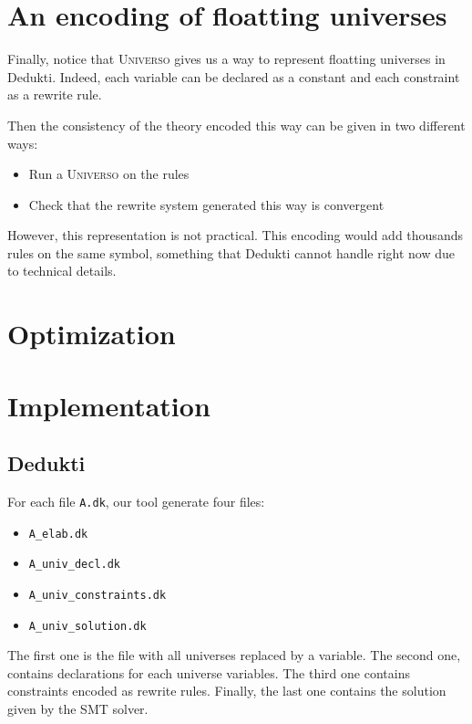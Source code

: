 \documentclass[conference]{IEEEtran}
\newcommand{\universo}{\textsc{Universo}}
\begin{document}
\section{An encoding of floatting universes}

Finally, notice that \universo{} gives us a way to represent floatting universes in Dedukti. Indeed, each variable can be declared as a constant and each constraint as a rewrite rule.

Then the consistency of the theory encoded this way can be given in two different ways:

\begin{itemize}
\item Run a \universo{} on the rules
\item Check that the rewrite system generated this way is convergent
\end{itemize}

However, this representation is not practical. This encoding would add thousands rules on the same symbol, something that Dedukti cannot handle right now due to technical details.

\section{Optimization}

\section{Implementation}

\subsection{Dedukti}
For each file \texttt{A.dk}, our tool generate four files:
\begin{itemize}
\item \texttt{A_elab.dk}
\item \texttt{A_univ_decl.dk}
\item \texttt{A_univ_constraints.dk}
\item \texttt{A_univ_solution.dk}
\end{itemize}

The first one is the file with all universes replaced by a variable. The second one, contains declarations for each universe variables. The third one contains constraints encoded as rewrite rules.
Finally, the last one contains the solution given by the SMT solver.
\end{document}
